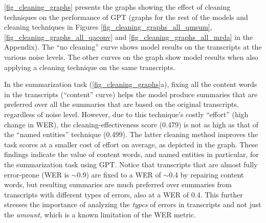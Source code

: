 \autoref{fig_cleaning_graphs} presents the graphs showing the effect of cleaning techniques on the performance of GPT (graphs for the rest of the models and cleaning techniques in Figures \ref{fig_cleaning_graphs_all_qmsum}, \ref{fig_cleaning_graphs_all_qaconv} and \ref{fig_cleaning_graphs_all_mrda} in the Appendix). The ``no cleaning'' curve shows model results on the transcripts at the various noise levels. The other curves on the graph show model results when also applying a cleaning technique on the same transcripts.

In the summarization task (\autoref{fig_cleaning_graphs}a), fixing all the content words in the transcripts (``content'' curve) helps the model produce summaries that are preferred over all the summaries that are based on the original transcripts, regardless of noise level. However, due to this technique's costly ``effort'' (high change in WER), the cleaning-effectiveness score (0.479) is not as high as that of the ``named entities'' technique (0.499). The latter cleaning method improves the task scores at a smaller cost of effort on average, as depicted in the graph. These findings indicate the value of content words, and named entities in particular, for the summarization task using GPT. Notice that transcripts that are almost fully error-prone (WER is $\sim$0.9) are fixed to a WER of $\sim$0.4 by repairing content words, but resulting summaries are much preferred over summaries from transcripts with different types of errors, also at a WER of 0.4. This further stresses the importance of analyzing the \textit{types} of errors in transcripts and not just the \textit{amount}, which is a known limitation of the WER metric.


